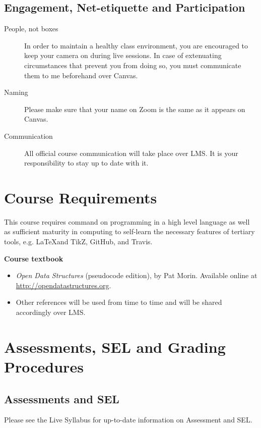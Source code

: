 \documentclass[a4paper]{article}
\begin{document}
\subsection{Engagement, Net-etiquette and Participation}
  \begin{description}
  \item[People, not boxes] In order to maintain a healthy class environment, you are encouraged to keep your camera on during live sessions. In case of extenuating circumstances that prevent you from doing so, you must communicate them to me beforehand over Canvas.
  \item[Naming] Please make sure that your name on Zoom is the same as it appears on Canvas.
  \item[Communication] All official course communication will take place over LMS. It is your responsibility to stay up to date with it. 
  \end{description}

\section{Course Requirements}

This course requires command on programming in a high level language as well as sufficient maturity in computing to self-learn the necessary features of tertiary tools, e.g. \LaTeX and TikZ, GitHub, and Travis.

\noindent\textbf{Course textbook}

\begin{itemize}
\item \textit{Open Data Structures} (pseudocode edition), by Pat Morin. Available online at \url{http://opendatastructures.org}.
\item Other references will be used from time to time and will be shared accordingly over LMS.
\end{itemize}

\section{Assessments, SEL and Grading Procedures}

\subsection{Assessments and SEL}

Please see the Live Syllabus for up-to-date information on Assessment and SEL.
\end{document}
